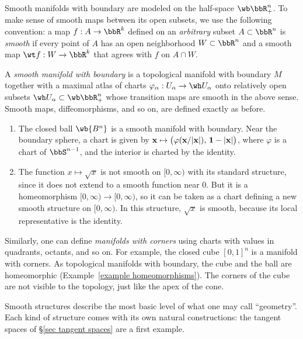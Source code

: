 Smooth manifolds with boundary are modeled on the half-space $\wb\bbR^n_+$. To make sense of smooth maps between its open subsets, we use the following convention: a map $f:A\to\bbR^k$ defined on an \emph{arbitrary} subset $A\subset\bbR^n$ is \emph{smooth} if every point of $A$ has an open neighborhood $W\subset\bbR^n$ and a smooth map $\wt f:W\to\bbR^k$ that agrees with $f$ on $A\cap W$.

\begin{defn}
    A \emph{smooth manifold with boundary} is a topological manifold with boundary $M$ together with a maximal atlas of charts $\varphi_\alpha:U_\alpha\to\wh U_\alpha$ onto relatively open subsets $\wh U_\alpha\subset\wb\bbR^n_+$ whose transition maps are smooth in the above sense. Smooth maps, diffeomorphisms, and so on, are defined exactly as before.
\end{defn}

\begin{example}
    \begin{enumerate}
        \item The closed ball $\wb{B^n}$ is a smooth manifold with boundary. Near the boundary sphere, a chart is given by $\bf{x}\mapsto\big(\varphi(\bf{x}/\lvert\bf{x}\rvert),\,1-\lvert\bf{x}\rvert\big)$, where $\varphi$ is a chart of $\bbS^{n-1}$, and the interior is charted by the identity.
        \item The function $x\mapsto\sqrt x$ is not smooth on $[0,\infty)$ with its standard structure, since it does not extend to a smooth function near $0$. But it is a homeomorphism $[0,\infty)\to[0,\infty)$, so it can be taken as a chart defining a new smooth structure on $[0,\infty)$. In this structure, $\sqrt x$ is smooth, because its local representative is the identity.
    \end{enumerate}
\end{example}

\begin{rem}
    Similarly, one can define \emph{manifolds with corners} using charts with values in quadrants, octants, and so on. For example, the closed cube $[0,1]^n$ is a manifold with corners. As topological manifolds with boundary, the cube and the ball are homeomorphic (Example~\ref{example homeomorphisms}). The corners of the cube are not visible to the topology, just like the apex of the cone.
\end{rem}

Smooth structures describe the most basic level of what one may call ``geometry''. Each kind of structure comes with its own natural constructions: the tangent spaces of \S\ref{sec tangent spaces} are a first example.

